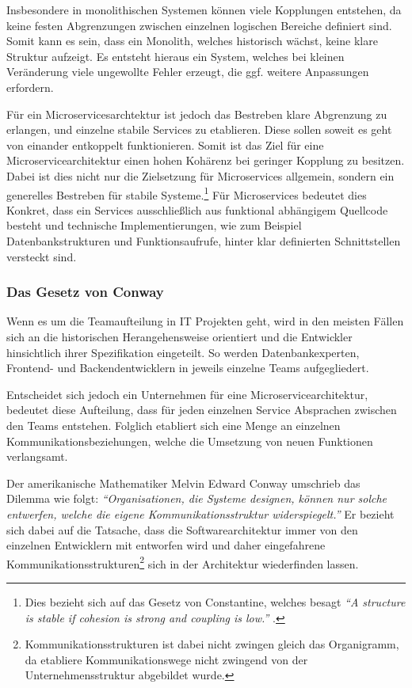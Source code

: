 Insbesondere in monolithischen Systemen können viele Kopplungen entstehen, da keine festen Abgrenzungen zwischen einzelnen logischen Bereiche definiert sind. Somit kann es sein, dass ein Monolith, welches historisch wächst, keine klare Struktur aufzeigt. Es entsteht hieraus ein System, welches bei kleinen Veränderung viele ungewollte Fehler erzeugt, die ggf. weitere Anpassungen erfordern.

Für ein Microservicesarchtektur ist jedoch das Bestreben klare Abgrenzung zu erlangen, und einzelne stabile Services zu etablieren. Diese sollen soweit es geht von einander entkoppelt funktionieren. Somit ist das Ziel für eine Microservicearchitektur einen hohen Kohärenz bei geringer Kopplung zu besitzen. Dabei ist dies nicht nur die Zielsetzung für Microservices allgemein, sondern ein generelles Bestreben für stabile Systeme.\footnote{Dies bezieht sich auf das Gesetz von Constantine, welches besagt \textit{\enquote{A structure is stable if cohesion is strong and coupling is low.}} \parencite[S. 43]{endres_handbook_2003}.} Für Microservices bedeutet dies Konkret, dass ein Services ausschließlich aus funktional abhängigem Quellcode besteht und technische Implementierungen, wie zum Beispiel Datenbankstrukturen und Funktionsaufrufe, hinter klar definierten Schnittstellen versteckt sind.

\subsubsection{Das Gesetz von Conway}
\label{sec:conway}

Wenn es um die Teamaufteilung in IT Projekten geht, wird in den meisten Fällen sich an die historischen Herangehensweise orientiert und die Entwickler hinsichtlich ihrer Spezifikation eingeteilt. So werden Datenbankexperten, Frontend- und Backendentwicklern in jeweils einzelne Teams aufgegliedert.

Entscheidet sich jedoch ein Unternehmen für eine Microservicearchitektur, bedeutet diese Aufteilung, dass für jeden einzelnen Service Absprachen zwischen den Teams entstehen. Folglich etabliert sich eine Menge an einzelnen Kommunikationsbeziehungen, welche die  Umsetzung von neuen Funktionen verlangsamt.

Der amerikanische Mathematiker Melvin Edward Conway umschrieb das Dilemma wie folgt:
\textit{\enquote{Organisationen, die Systeme designen, können nur solche entwerfen, welche die eigene Kommunikationsstruktur widerspiegelt.}}
Er bezieht sich dabei auf die Tatsache, dass die Softwarearchitektur immer von den einzelnen Entwicklern mit entworfen wird und daher eingefahrene Kommunikationsstrukturen\footnote{Kommunikationsstrukturen ist dabei nicht zwingen gleich das Organigramm, da etabliere Kommunikationswege nicht zwingend von der Unternehmensstruktur abgebildet wurde.} sich in der Architektur wiederfinden lassen.


